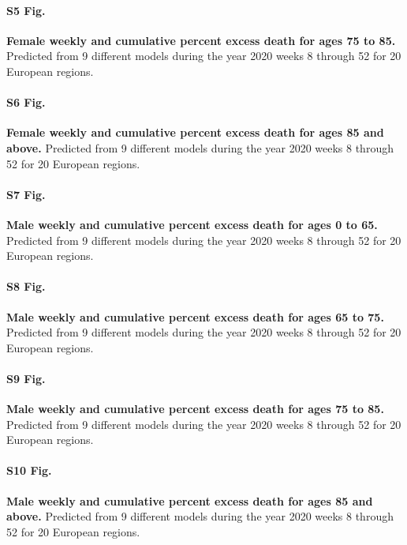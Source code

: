 \documentclass[10pt,letterpaper]{article}
\begin{document}
\paragraph*{S5 Fig.}
\label{S5_Fig}
{\bf Female weekly and cumulative percent excess death for ages 75 to 85.} Predicted from 9 different models during the year 2020 weeks 8 through 52 for 20 European regions.

\paragraph*{S6 Fig.}
\label{S6_Fig}
{\bf Female weekly and cumulative percent excess death for ages 85 and above.} Predicted from 9 different models during the year 2020 weeks 8 through 52 for 20 European regions.


\paragraph*{S7 Fig.}
\label{S7_Fig}
{\bf Male weekly and cumulative percent excess death for ages 0 to 65.} Predicted from 9 different models during the year 2020 weeks 8 through 52 for 20 European regions.

\paragraph*{S8 Fig.}
\label{S8_Fig}
{\bf Male weekly and cumulative percent excess death for ages 65 to 75.} Predicted from 9 different models during the year 2020 weeks 8 through 52 for 20 European regions.

\paragraph*{S9 Fig.}
\label{S9_Fig}
{\bf Male weekly and cumulative percent excess death for ages 75 to 85.} Predicted from 9 different models during the year 2020 weeks 8 through 52 for 20 European regions.

\paragraph*{S10 Fig.}
\label{S10_Fig}
{\bf Male weekly and cumulative percent excess death for ages 85 and above.} Predicted from 9 different models during the year 2020 weeks 8 through 52 for 20 European regions.

\end{document}
